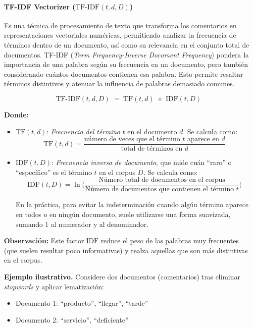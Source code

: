 \documentclass{matematicasud}
\begin{document}
\paragraph{TF-IDF Vectorizer (\(\text{TF-IDF}(t,d,D)\))}
Es una técnica de procesamiento de texto que transforma los comentarios en representaciones vectoriales numéricas, permitiendo analizar la frecuencia de términos dentro de un documento, así como su relevancia en el conjunto total de documentos. TF-IDF (\textit{Term Frequency-Inverse Document Frequency}) pondera la importancia de una palabra según su frecuencia en un documento, pero también considerando cuántos documentos contienen esa palabra. Esto permite resaltar términos distintivos y atenuar la influencia de palabras demasiado comunes.

\[
\text{TF-IDF}(t, d, D) \;=\; \text{TF}(t, d) \;\times\; \text{IDF}(t, D)
\]

\noindent\textbf{Donde:}
\begin{itemize}
    \item \(\text{TF}(t,d)\): \textit{Frecuencia del término} \(t\) en el documento \(d\). Se calcula como:
    \[
    \text{TF}(t,d) = \frac{\text{número de veces que el término } t \text{ aparece en } d}{\text{total de términos en } d}
    \]
    \item \(\text{IDF}(t,D)\): \textit{Frecuencia inversa de documento}, que mide cuán ``raro'' o ``específico'' es el término \(t\) en el corpus \(D\). Se calcula como:
    \[
    \text{IDF}(t,D) = \ln\!\Biggl(\frac{\text{Número total de documentos en el corpus}}{\text{Número de documentos que contienen el término } t}\Biggr)
    \]
    
    En la práctica, para evitar la indeterminación cuando algún término aparece en todos o en ningún documento, suele utilizarse una forma suavizada, sumando 1 al numerador y al denominador.
    
\end{itemize}

\noindent\textbf{Observación:} Este factor \(\text{IDF}\) reduce el peso de las palabras muy frecuentes (que suelen resultar poco informativas) y realza aquellas que son más distintivas en el corpus.

\vspace{0.5em}
\noindent
\textbf{Ejemplo ilustrativo.} Considere dos documentos (comentarios) tras eliminar \textit{stopwords} y aplicar lematización:
\begin{itemize}
    \item Documento 1: ``producto'', ``llegar'', ``tarde''
    \item Documento 2: ``servicio'', ``deficiente''
\end{itemize}
\end{document}
